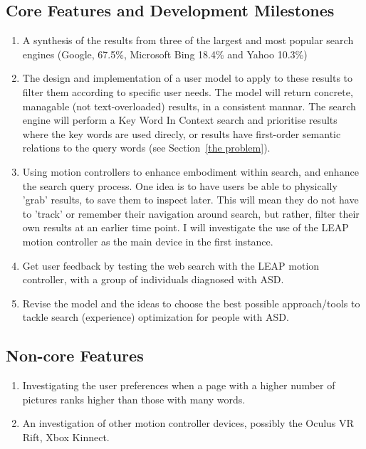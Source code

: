 \documentclass[10pt]{article}
\begin{document}
\subsection{Core Features and Development Milestones}
\begin{enumerate}
\item A synthesis of the results from three of the largest and most popular search engines (Google, 67.5\%, Microsoft Bing 18.4\% and Yahoo 10.3\%) \cite{adam}

\item The design and implementation of a user model to apply to these results to filter them according to specific user needs. The model will return concrete, managable (not text-overloaded) results, in a consistent mannar. The search engine will perform a Key Word In Context search and prioritise results where the key words are used direcly, or results have first-order semantic relations to the query words (see Section~\ref{the problem}).

\item Using motion controllers to enhance embodiment within search, and enhance the search query process. One idea is to have users be able to physically 'grab' results, to save them to inspect later. This will mean they do not have to 'track' or remember their navigation around search, but rather, filter their own results at an earlier time point. I will investigate the use of the LEAP motion controller as the main device in the first instance.

\item Get user feedback by testing the web search with the LEAP motion controller, with a group of individuals diagnosed with ASD.

\item Revise the model and the ideas to choose the best possible approach/tools to tackle search (experience) optimization for people with ASD.

\end{enumerate}

\subsection{Non-core Features}
\begin{enumerate}

\item Investigating the user preferences when a page with a higher number of pictures ranks higher than those with many words. 

\item An investigation of other motion controller devices, possibly the Oculus VR Rift, Xbox Kinnect.

\end{enumerate}
\end{document}

